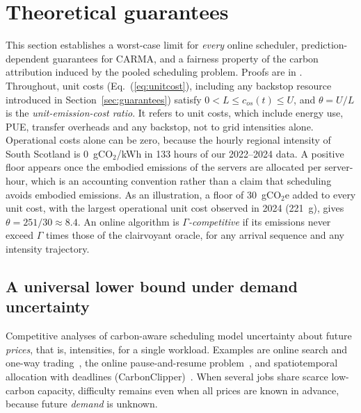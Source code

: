 \section{Theoretical guarantees}\label{sec:theory}

This section establishes a worst-case limit for \emph{every} online scheduler, prediction-dependent guarantees for CARMA, and a fairness property of the carbon attribution induced by the pooled scheduling problem. Proofs are in . Throughout, unit costs (Eq.~(\ref{eq:unitcost}), including any backstop resource introduced in Section~\ref{sec:guarantees}) satisfy $0<L\le c_{os}(t)\le U$, and $\theta=U/L$ is the \emph{unit-emission-cost ratio}. It refers to unit costs, which include energy use, PUE, transfer overheads and any backstop, not to grid intensities alone. Operational costs alone can be zero, because the hourly regional intensity of South Scotland is 0~gCO$_2$/kWh in 133 hours of our 2022--2024 data. A positive floor appears once the embodied emissions of the servers are allocated per server-hour, which is an accounting convention rather than a claim that scheduling avoids embodied emissions. As an illustration, a floor of 30~gCO$_2$e added to every unit cost, with the largest operational unit cost observed in 2024 (221~g), gives $\theta=251/30\approx 8.4$. An online algorithm is \emph{$\Gamma$-competitive} if its emissions never exceed $\Gamma$ times those of the clairvoyant oracle, for any arrival sequence and any intensity trajectory.

\subsection{A universal lower bound under demand uncertainty}\label{sec:lb}

Competitive analyses of carbon-aware scheduling model uncertainty about future \emph{prices}, that is, intensities, for a single workload. Examples are online search and one-way trading~\cite{elyaniv2001optimal}, the online pause-and-resume problem~\cite{lechowicz2023online}, and spatiotemporal allocation with deadlines (CarbonClipper)~\cite{lechowicz2025learning}. When several jobs share scarce low-carbon capacity, difficulty remains even when all prices are known in advance, because future \emph{demand} is unknown.

